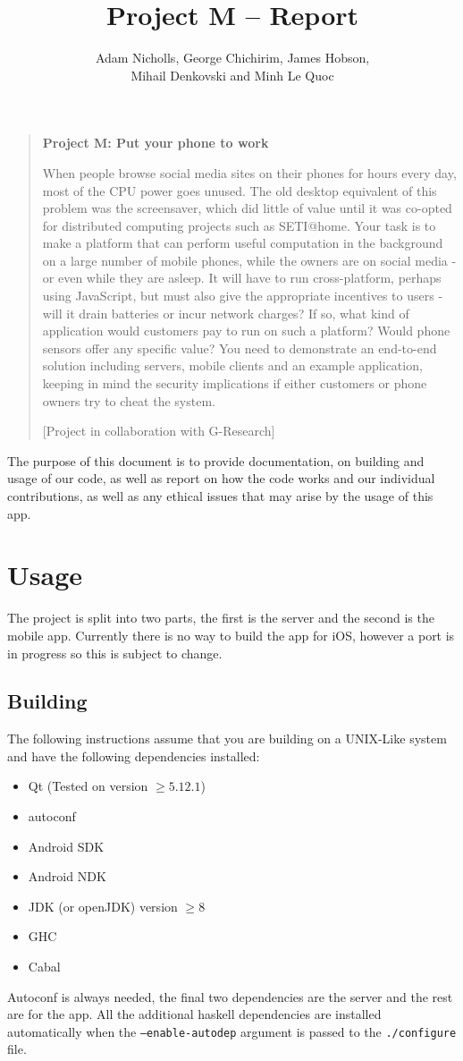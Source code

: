 \documentclass{article}
\title{Project M -- Report}
\author{Adam Nicholls, George Chichirim, James Hobson, \\ Mihail Denkovski and Minh Le Quoc}
\begin{document}
\maketitle
\begin{quote}
  \textbf{Project M: Put your phone to work}

When people browse social media sites on their phones for hours every day, most of the CPU power goes unused. The old desktop equivalent of this problem was the screensaver, which did little of value until it was co-opted for distributed computing projects such as SETI@home. Your task is to make a platform that can perform useful computation in the background on a large number of mobile phones, while the owners are on social media - or even while they are asleep. It will have to run cross-platform, perhaps using JavaScript, but must also give the appropriate incentives to users - will it drain batteries or incur network charges? If so, what kind of application would customers pay to run on such a platform? Would phone sensors offer any specific value? You need to demonstrate an end-to-end solution including servers, mobile clients and an example application, keeping in mind the security implications if either customers or phone owners try to cheat the system.

[Project in collaboration with G-Research]
\end{quote}
The purpose of this document is to provide documentation, on building and usage of our code, as well as report on how the
code works and our individual contributions, as well as any ethical issues that may arise by the usage of this app.
\tableofcontents
\section{Usage}
The project is split into two parts, the first is the server and the second is the mobile app. Currently there is no way
to build the app for iOS, however a port is in progress so this is subject to change.
\subsection{Building}
The following instructions assume that you are building on a UNIX-Like system and have the following dependencies installed:
\begin{itemize}
  \item{Qt (Tested on version \(\geq 5.12.1\))}
  \item{autoconf}
  \item{Android SDK}
  \item{Android NDK}
  \item{JDK (or openJDK) version \(\geq 8\)}
  \item{GHC}
  \item{Cabal}
\end{itemize}
Autoconf is always needed, the final two dependencies are the server and the rest are for the app. All the additional haskell dependencies are installed
automatically when the \texttt{--enable-autodep} argument is passed to the \texttt{./configure} file.
\end{document}
